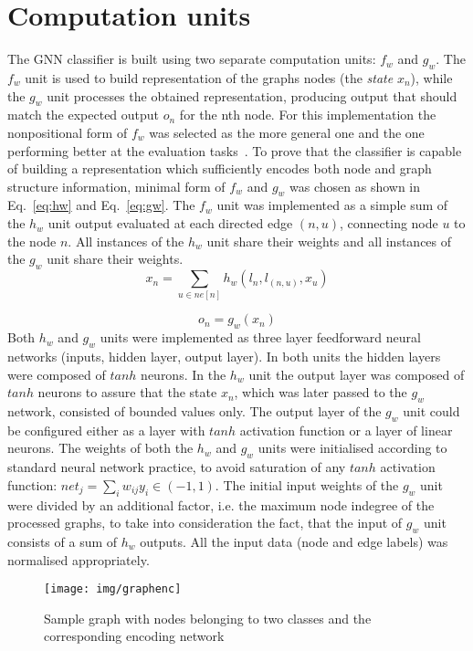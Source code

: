 \documentclass[]{spie}  %
\begin{document}
\section{Computation units}
The GNN classifier is built using two separate computation units: $f_w$ and $g_w$. The $f_w$ unit is used to build representation of the graphs nodes (the \emph{state} $x_n$), while the $g_w$ unit processes the obtained representation, producing output that should match the expected output $o_n$ for the nth node. For this implementation the nonpositional form of $f_w$ was selected as the more general one and the one performing better at the evaluation tasks~\cite{scarselli2009graph}. To prove that the classifier is capable of building a representation which sufficiently encodes both node and graph structure information, minimal form of $f_w$ and $g_w$ was chosen as shown in Eq.~\ref{eq:hw} and Eq.~\ref{eq:gw}. The $f_w$ unit was implemented as a simple sum of the $h_w$ unit output evaluated at each directed edge $(n, u)$, connecting node $u$ to the node $n$. All instances of the $h_w$ unit share their weights and all instances of the $g_w$ unit share their weights. 
\begin{equation}
x_n = \sum_{u \in ne[n]} h_w(l_n, l_{(n, u)}, x_u)
\label{eq:hw}
\end{equation}

\begin{equation}
o_n = g_w(x_n)
\label{eq:gw}
\end{equation}
Both $h_w$ and $g_w$ units were implemented as three layer feedforward neural networks (inputs, hidden layer, output layer). In both units the hidden layers were composed of $tanh$ neurons. In the $h_w$ unit the output layer was composed of $tanh$ neurons to assure that the state $x_n$, which was later passed to the $g_w$ network, consisted of bounded values only. The output layer of the $g_w$ unit could be configured either as a layer with $tanh$ activation function or a layer of linear neurons. The weights of both the $h_w$ and $g_w$ units were initialised according to standard neural network practice, to avoid saturation of any $tanh$ activation function: $net_j = \sum_i w_{ij} y_i \in (-1, 1)$. The initial input weights of the $g_w$ unit were divided by an additional factor, i.e. the maximum node indegree of the processed graphs, to take into consideration the fact, that the input of $g_w$ unit consists of a sum of $h_w$ outputs. All the input data (node and edge labels) was normalised appropriately.

\begin{figure}
\begin{center}
	\texttt{[image: img/graphenc]}
	\caption{Sample graph with nodes belonging to two classes and the corresponding encoding network}
	\label{fig:graphenc}
\end{center}
\end{figure}
\end{document}
